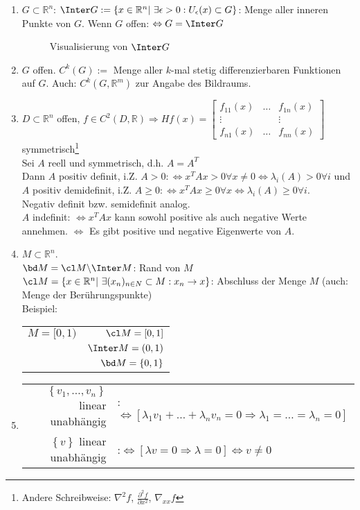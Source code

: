 \begin{enumerate}[label=\arabic*)]
  \item $G\subset\mathbb{R}^n$: $\Inter G:=\left\{x\in\mathbb{R}^n|\ \exists\epsilon>0:U_{\epsilon}(x)\subset G \right\}$: Menge aller inneren Punkte von $G$. Wenn $G$ offen:
  $\Leftrightarrow G=\Inter G$
 	\begin{figure}[htb]
	\centering
		
		\caption{Visualisierung von $\Inter G$}
		\label{fig:kap_1_inter_g}
	\end{figure}
  \item $G$ offen. $C^k(G):=$ Menge aller $k$-mal stetig differenzierbaren Funktionen auf $G$. Auch: $C^k(G,\mathbb{R}^m)$ zur Angabe des Bildraums.
  \item $D\subset\mathbb{R}^n$ offen, $f\in C^2(D,\mathbb{R})\Rightarrow H f(x)=\begin{bmatrix}
  f_{11}(x) & \ldots & f_{1n}(x) \\
  \vdots 	&		 & \vdots\\
  f_{n1}(x) & \ldots & f_{nn}(x)
  \end{bmatrix}$ symmetrisch\footnote{Andere Schreibweise: $\nabla^2 f$, $\frac{\partial^2 f}{\partial x^2}$, $\nabla_{xx}f$}\\
  Sei $A$ reell und symmetrisch, d.h. $A=A^T$\\
  Dann $A$ positiv definit, i.Z. $A>0:\Leftrightarrow x^TAx>0\forall x\neq 0\Leftrightarrow \lambda_i(A)>0\forall i$ und $A$ positiv demidefinit, i.Z. $A\ge 0:\Leftrightarrow x^TAx\ge
  0\forall x\Leftrightarrow \lambda_i(A)\ge 0\forall i$.\\
  Negativ definit bzw. semidefinit analog.\\
  $A$ indefinit: $\Leftrightarrow x^TAx$ kann sowohl positive als auch negative Werte annehmen. $\Leftrightarrow$ Es gibt positive und negative Eigenwerte von $A$.
  \item $M\subset \mathbb{R}^n$.\\
		$\bd M = \cl M\backslash\Inter M$: Rand von $M$\\
		$\cl M =\left\{x\in\mathbb{R}^n|\ \exists(x_n)_{n\in N}\subset M:x_n\rightarrow x \right\}$: Abschluss der Menge $M$ (auch: Menge der Berührungspunkte)\\
		Beispiel: \begin{tabular}[t]{lr}
			$M=[0,1)$ & $\cl M=[0,1]$\\
					  & $\Inter M = (0,1)$\\
					  & $\bd M =\{0,1\}$
		\end{tabular}
  \item \begin{tabular}[t]{rl}
  $\left\{v_1,\ldots,v_n \right\}$ linear unabhängig &:$\Leftrightarrow [\lambda_1 v_1+\ldots+\lambda_n v_n=0\Rightarrow \lambda_1=\ldots=\lambda_n=0]$\\
  $\left\{v \right\}$ linear unabhängig &:$\Leftrightarrow [\lambda v=0\Rightarrow \lambda = 0]\Leftrightarrow v\neq 0$
  \end{tabular}
\end{enumerate}
